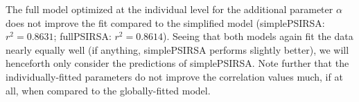\documentclass[10pt,a4paper]{article}
\newcommand{\gcs}[1]{\textcolor{blue}{[gcs: #1]}}
\begin{document}
The full model optimized at the individual level for the additional parameter $\alpha$ does not improve the fit compared to the simplified model (simplePSIRSA: $r^{2}=0.8631$; fullPSIRSA: $r^{2}=0.8614$). 
Seeing that both models again fit the data nearly equally well (if anything, simplePSIRSA performs slightly better), we will henceforth only consider the predictions of simplePSIRSA.
Note further that the individually-fitted parameters do not improve the correlation values much, if at all, when compared to the globally-fitted model. 







\end{document}
